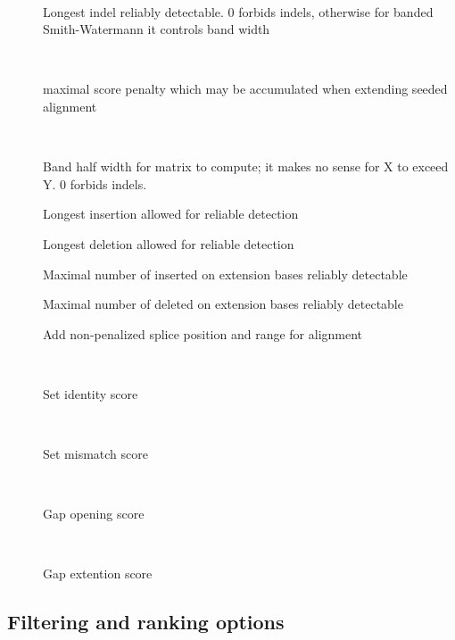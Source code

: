 \documentclass[english,letter]{article}
\begin{document}
\begin{description}
\item[~~]
				Longest indel reliably detectable. 0 forbids indels, otherwise 
                for banded Smith-Watermann it controls band width
\item[~~]
				maximal score penalty which may be accumulated when extending
                seeded alignment
\item[~~]
				Band half width for matrix to compute; it makes no sense for X
                to exceed Y. 0 forbids indels.
\item[]
				Longest insertion allowed for reliable detection
\item[]
				Longest deletion allowed for reliable detection
\item[]
				Maximal number of inserted on extension bases reliably detectable
\item[]
				Maximal number of deleted on extension bases reliably detectable
\item[]
				Add non-penalized splice position and range for alignment
\item[~~]
				Set identity score
\item[~~]
				Set mismatch score
\item[~~]
				Gap opening score
\item[~~]
				Gap extention score
\end{description}

\subsection{Filtering and ranking options}
\end{document}
